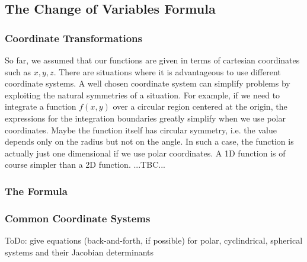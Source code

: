 


\subsection{The Change of Variables Formula}

\subsubsection{Coordinate Transformations}
So far, we assumed that our functions are given in terms of cartesian coordinates such as $x,y,z$. There are situations where it is advantageous to use different coordinate systems. A well chosen coordinate system can simplify problems by exploiting the natural symmetries of a situation. For example, if we need to integrate a function $f(x,y)$ over a circular region centered at the origin, the expressions for the integration boundaries greatly simplify when we use polar coordinates. Maybe the function itself has circular symmetry, i.e. the value depends only on the radius but not on the angle. In such a case, the function is actually just one dimensional if we use polar coordinates. A 1D function is of course simpler than a 2D function. 
...TBC...

\subsubsection{The Formula}

\subsubsection{Common Coordinate Systems}
ToDo: give equations (back-and-forth, if possible) for polar, cyclindrical, spherical systems and their Jacobian determinants

